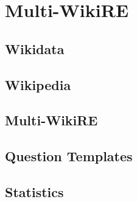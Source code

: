 \chapter{Multi-WikiRE}

\section{Wikidata}

\section{Wikipedia}

\section{Multi-WikiRE}

\section{Question Templates}

\section{Statistics}